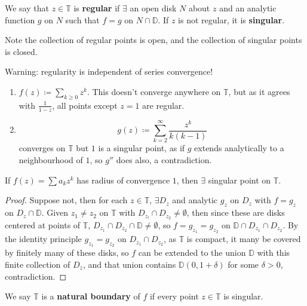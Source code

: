 \documentclass{article}
\begin{document}
\begin{defi}
    We say that $z \in \mathbb{T}$ is \textbf{regular} if $\exists$ an open disk $N$ about $z$ and an analytic function $g$ on $N$ such that $f = g$ on $N \cap \mathbb{D}$. If $z$ is not regular, it is \textbf{singular}.
\end{defi}

Note the collection of regular points is open, and the collection of singular points is closed.

Warning: regularity is independent of series convergence!
\begin{enumerate}[label=(\arabic*)]
    \item $f(z) \coloneqq \sum_{k \geq 0} z^k$. This doesn't converge anywhere on $\mathbb{T}$, but as it agrees with $\frac1{1-z}$, all points except $z=1$ are regular.
    \item
        \begin{equation}
            g(z) \coloneqq \sum_{k=2}^\infty \frac{z^k}{k(k-1)}
        \end{equation}
        converges on $\mathbb{T}$ but $1$ is a singular point, as if $g$ extends analytically to a neighbourhood of $1$, so $g''$ does also, a contradiction.
\end{enumerate}

\begin{prop}
    If $f(z) = \sum a_k z^k$ has radius of convergence $1$, then $\exists$ singular point on $\mathbb{T}$.
\end{prop}

\begin{proof}
    Suppose not, then for each $z \in \mathbb{T}$, $\exists D_z$ and analytic $g_z$ on $D_z$ with $f = g_z$ on $D_z \cap \mathbb{D}$. Given $z_1 \neq z_2$ on $\mathbb{T}$ with $D_{z_!} \cap D_{z_2} \neq \emptyset$, then since these are disks centered at points of $\mathbb{T}$, $D_{z_1} \cap D_{z_2} \cap \mathbb{D} \neq \emptyset$, so $f = g_{z_1} = g_{z_2}$ on $\mathbb{D} \cap D_{z_1} \cap D_{z_2}$. By the identity principle $g_{z_1} = g_{z_2}$ on $D_{z_1} \cap D_{z_2}$, as $\mathbb{T}$ is compact, it many be covered by finitely many of these disks, so $f$ can be extended to the union $\mathbb{D}$ with this finite collection of $D_z$, and that union contains $\mathbb{D}(0, 1 + \delta)$ for some $\delta > 0$, contradiction.
\end{proof}

\begin{defi}
    We say $\mathbb{T}$ is a \textbf{natural boundary} of $f$ if every point $z \in \mathbb{T}$ is singular.
\end{defi}
\end{document}
